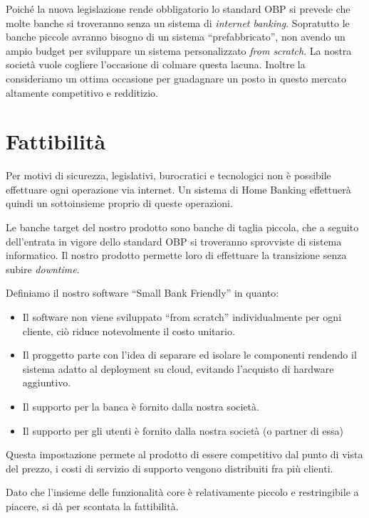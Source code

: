 \documentclass[10pt]{softeng} %
\begin{document}
Poich\'e la nuova legislazione rende obbligatorio lo standard OBP si prevede che molte banche si troveranno senza un sistema di \emph{internet banking}.
Sopratutto le banche piccole avranno bisogno di un sistema ``prefabbricato'', non avendo un ampio budget per sviluppare un sistema personalizzato \emph{from scratch}.
La nostra societ\`a vuole cogliere l'occasione di colmare questa lacuna.
Inoltre la consideriamo un ottima occasione per guadagnare un posto in questo mercato altamente competitivo e redditizio.

\section{Fattibilit\`a}

Per motivi di sicurezza, legislativi, burocratici e tecnologici non \`e possibile effettuare ogni operazione via internet.
Un sistema di Home Banking effettuer\`a quindi un sottoinsieme proprio di queste operazioni.

Le banche target del nostro prodotto sono banche di taglia piccola, che a seguito dell'entrata in vigore dello standard OBP si troveranno sprovviste di sistema informatico.
Il nostro prodotto permette loro di effettuare la transizione senza subire \emph{downtime}.

Definiamo il nostro software ``Small Bank Friendly'' in quanto:
\begin{itemize}
    \item Il software non viene sviluppato ``from scratch'' individualmente per ogni cliente, ci\`o riduce notevolmente il costo unitario.
    \item Il proggetto parte con l'idea di separare ed isolare le componenti rendendo il sistema adatto al deployment su cloud, evitando l'acquisto di hardware aggiuntivo.
    \item Il supporto per la banca \`e fornito dalla nostra societ\`a.
    \item Il supporto per gli utenti \`e fornito dalla nostra societ\`a (o partner di essa)
\end {itemize}

Questa impostazione permete al prodotto di essere competitivo dal punto di vista del prezzo, i costi di servizio di supporto vengono distribuiti fra pi\`u clienti. 

Dato che l'insieme delle funzionalit\`a core \`e relativamente piccolo e restringibile a piacere, si d\`a per scontata la fattibilit\`a.
\end{document}
